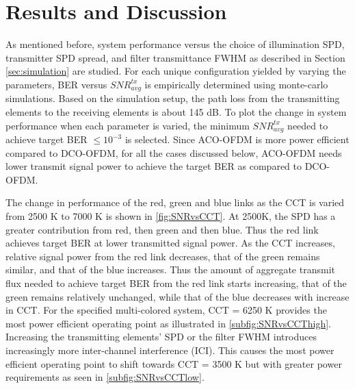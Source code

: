 \section{Results and Discussion}\label{sec:results}
As mentioned before, system performance versus the choice of illumination SPD, transmitter SPD spread, and filter transmittance FWHM as described in Section \ref{sec:simulation} are studied. For each unique configuration yielded by varying the parameters, BER versus $SNR_{avg}^{tx}$ is empirically determined using monte-carlo simulations. Based on the simulation setup, the path loss from the transmitting elements to the receiving elements is about 145 dB. To plot the change in system performance when each parameter is varied, the minimum $SNR_{avg}^{tx}$ needed to achieve target BER $\leq 10^{-3}$ is selected. Since ACO-OFDM is more power efficient compared to DCO-OFDM, for all the cases discussed below, ACO-OFDM needs lower transmit signal power to achieve the target BER as compared to DCO-OFDM.



The change in performance of the red, green and blue links as the CCT is varied from 2500 K to 7000 K is shown in \figurename{\ref{fig:SNRvsCCT}}. At 2500K, the SPD has a greater contribution from red, then green and then blue. Thus the red link achieves target BER at lower transmitted signal power. As the CCT increases, relative signal power from the red link decreases, that of the green remains similar, and that of the blue increases. Thus the amount of aggregate transmit flux needed to achieve target BER from the red link starts increasing, that of the green remains relatively unchanged, while that of the blue decreases with increase in CCT. For the specified multi-colored system, CCT = 6250 K provides the most power efficient operating point as illustrated in \figurename{\ref{subfig:SNRvsCCThigh}}. Increasing the transmitting elements' SPD or the filter FWHM introduces increasingly more inter-channel interference (ICI). This causes the most power efficient operating point to shift towards CCT = 3500 K but with greater power requirements as seen in \figurename{\ref{subfig:SNRvsCCTlow}}.

